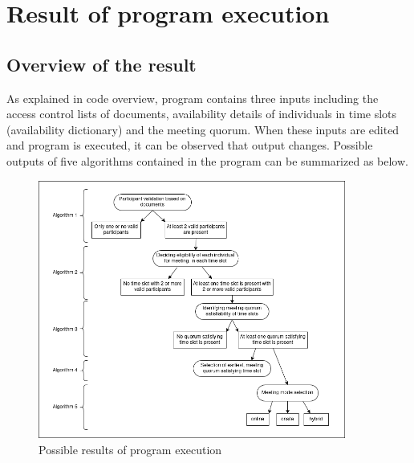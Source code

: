 \section{Result of program execution}
\subsection{Overview of the result}
As explained in code overview, program contains three inputs including the access control lists of documents, availability details of individuals in time slots (availability dictionary) and the meeting quorum. When these inputs are edited and program is executed, it can be observed that output changes. Possible outputs of five algorithms contained in the program can be summarized as below.\\ 
\begin{figure}[H]
    \centering
    \includegraphics[width=0.9\textwidth]{./image/workflow_execution_result.png}
    \caption{Possible results of program execution}
    \label{fig:possible results of program execution}
\end{figure}

